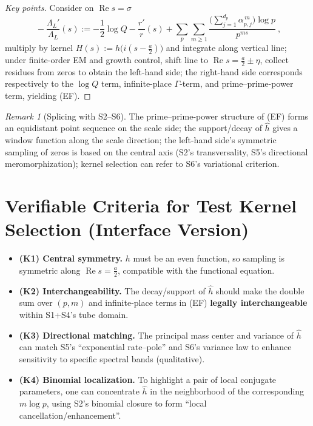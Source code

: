 \documentclass[11pt,a4paper]{article}
\theoremstyle{remark}
\newtheorem{remark}[theorem]{Remark}
\DeclareMathOperator{\Re}{Re}
\begin{document}
\begin{proof}[Key points]
Consider on $\Re s=\sigma$
\begin{equation}
\boxed{\ -\frac{\Lambda_{L}'}{\Lambda_{L}}(s)
:=-\frac{1}{2}\log Q-\frac{r'}{r}(s)+\sum_{p}\sum_{m\ge1}\frac{\Big(\sum_{j=1}^{d_p}\alpha_{p,j}^{\,m}\Big)\log p}{p^{ms}}\ },
\end{equation}
multiply by kernel $H(s):=h\!\big(i(s-\frac{a}{2})\big)$ and integrate along vertical line; under finite-order EM and growth control, shift line to $\Re s=\frac{a}{2}\pm\eta$, collect residues from zeros to obtain the left-hand side; the right-hand side corresponds respectively to the $\log Q$ term, infinite-place $\Gamma$-term, and prime--prime-power term, yielding (EF).
\end{proof}

\begin{remark}[Splicing with S2--S6]
The prime--prime-power structure of (EF) forms an equidistant point sequence on the scale side; the support/decay of $\widehat{h}$ gives a window function along the scale direction; the left-hand side's symmetric sampling of zeros is based on the central axis (S2's transversality, S5's directional meromorphization); kernel selection can refer to S6's variational criterion.
\end{remark}

\section{Verifiable Criteria for Test Kernel Selection (Interface Version)}

\begin{itemize}
\item \textbf{(K1) Central symmetry.} $h$ must be an even function, so sampling is symmetric along $\Re s=\frac{a}{2}$, compatible with the functional equation.

\item \textbf{(K2) Interchangeability.} The decay/support of $\widehat{h}$ should make the double sum over $(p,m)$ and infinite-place terms in (EF) \textbf{legally interchangeable} within S1+S4's tube domain.

\item \textbf{(K3) Directional matching.} The principal mass center and variance of $\widehat{h}$ can match S5's ``exponential rate--pole'' and S6's variance law to enhance sensitivity to specific spectral bands (qualitative).

\item \textbf{(K4) Binomial localization.} To highlight a pair of local conjugate parameters, one can concentrate $\widehat{h}$ in the neighborhood of the corresponding $m\log p$, using S2's binomial closure to form ``local cancellation/enhancement''.
\end{itemize}
\end{document}
